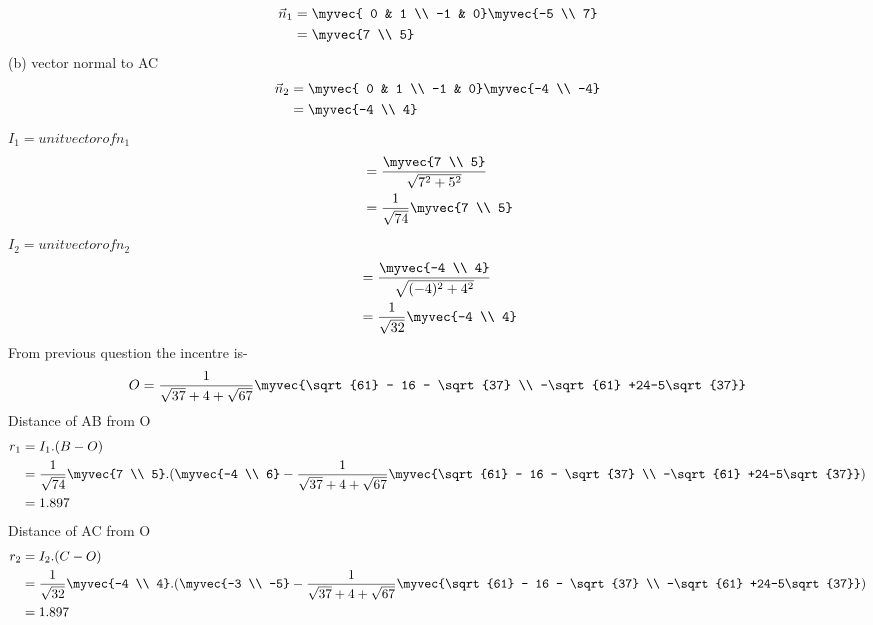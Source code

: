 \documentclass[journal,12pt,twocolumn]{IEEEtran}
\theoremstyle{remark}
\begin{document}
\begin{align}
\vec{n}_1 &= \myvec{ 0 & 1 \\ -1 & 0}\myvec{-5 \\ 7}\\
&= \myvec{7 \\ 5}
\end{align}
(b) vector normal to AC
\begin{align}
\vec{n}_2 &= \myvec{ 0 & 1 \\ -1 & 0}\myvec{-4 \\ -4}\\
&= \myvec{-4 \\ 4}
\end{align}
$I_1= unit vector of n_1 $
\begin{align}
&= \frac{\myvec{7 \\ 5}}{\sqrt{7^2 + 5^2}}\\
&=\frac{1}{\sqrt{74}}\myvec{7 \\ 5}
\end{align}
$I_2= unit vector of n_2 $
\begin{align}
&= \frac{\myvec{-4 \\ 4}}{\sqrt{(-4)^2 + 4^2}}\\
&=\frac{1}{\sqrt{32}}\myvec{-4 \\ 4}
\end{align}
From previous question the incentre is-
\begin{align}
O = \frac{1}{\sqrt{37} + 4 + \sqrt{67}}\myvec{\sqrt{61} - 16 - \sqrt{37} \\ -\sqrt{61} +24-5\sqrt{37}} 
\end{align}
Distance of AB from O
\begin{align}
r_1 &= I_1 . (B-O)\\
&= \frac{1}{\sqrt{74}}\myvec{7 \\ 5} . (\myvec{-4 \\ 6} - \frac{1}{\sqrt{37} + 4 + \sqrt{67}}\myvec{\sqrt{61} - 16 - \sqrt{37} \\ -\sqrt{61} +24-5\sqrt{37}} )\\
&= 1.897
\end{align}
Distance of AC from O
\begin{align}
r_2 &= I_2 . (C-O)\\
&= \frac{1}{\sqrt{32}}\myvec{-4 \\ 4} . (\myvec{-3 \\ -5} - \frac{1}{\sqrt{37} + 4 + \sqrt{67}}\myvec{\sqrt{61} - 16 - \sqrt{37} \\ -\sqrt{61} +24-5\sqrt{37}} )\\
&= 1.897
\end{align}
\end{document}
